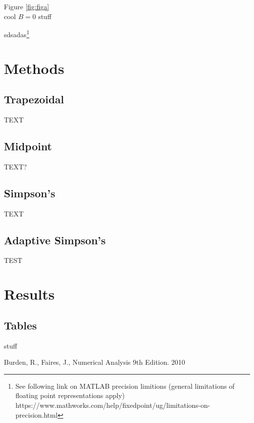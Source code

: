 \documentclass[a4paper]{article}
\begin{document}
Figure \ref{fig:figa}\\



cool $B=0$ stuff 




sdsadas\footnote{See following link on MATLAB precision limitions (general limitations of floating point representations apply) https://www.mathworks.com/help/fixedpoint/ug/limitations-on-precision.html}


\newpage
\section{Methods}
\label{sec:methods}

\subsection{Trapezoidal}
TEXT


\subsection{Midpoint}
TEXT? 

\subsection{Simpson's}
TEXT

\subsection{Adaptive Simpson's}
TEST



\newpage
\section{Results}
\label{sec:results}

\subsection{Tables}
stuff



\newpage
\begin{thebibliography}{9}
  Burden, R., Faires, J., Numerical Analysis 9th Edition. 2010

\end{thebibliography}
\end{document}
